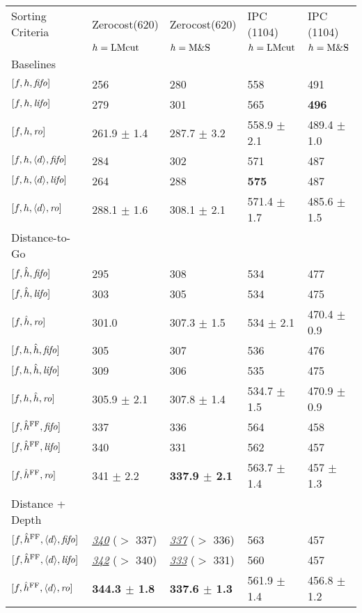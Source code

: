 \begin{center}
\begin{tabular}{|l|ll|ll|}
Sorting Criteria & Zerocost(620) & Zerocost(620) & IPC (1104) & IPC (1104)\\
 & \(h=\text{LMcut}\) & \(h=\text{M\&S}\) & \(h=\text{LMcut}\) & \(h=\text{M\&S}\)\\
Baselines &  &  &  & \\
\([f,h,{\text{\textit{fifo}}}]\) & 256 & 280 & 558 & 491\\
\([f,h,{\text{\textit{lifo}}}]\) & 279 & 301 & 565 & \textbf{496}\\
\([f,h,{\text{\textit{ro}}}]\) & 261.9 \(\pm\) 1.4 & 287.7 \(\pm\) 3.2 & 558.9 \(\pm\) 2.1 & 489.4 \(\pm\) 1.0\\
\([f,h,{\left<d\right>},{\text{\textit{fifo}}}]\) & 284 & 302 & 571 & 487\\
\([f,h,{\left<d\right>},{\text{\textit{lifo}}}]\) & 264 & 288 & \textbf{575} & 487\\
\([f,h,{\left<d\right>},{\text{\textit{ro}}}]\) & 288.1 \(\pm\) 1.6 & 308.1 \(\pm\) 2.1 & 571.4 \(\pm\) 1.7 & 485.6 \(\pm\) 1.5\\[0.3em]
Distance-to-Go &  &  &  & \\
\([f,\hat{h},{\text{\textit{fifo}}}]\) & 295 & 308 & 534 & 477\\
\([f,\hat{h},{\text{\textit{lifo}}}]\) & 303 & 305 & 534 & 475\\
\([f,\hat{h},{\text{\textit{ro}}}]\) & 301.0 & 307.3 \(\pm\) 1.5 & 534 \(\pm\) 2.1 & 470.4 \(\pm\) 0.9\\
\([f,h,\hat{h},{\text{\textit{fifo}}}]\) & 305 & 307 & 536 & 476\\
\([f,h,\hat{h},{\text{\textit{lifo}}}]\) & 309 & 306 & 535 & 475\\
\([f,h,\hat{h},{\text{\textit{ro}}}]\) & 305.9 \(\pm\) 2.1 & 307.8 \(\pm\) 1.4 & 534.7 \(\pm\) 1.5 & 470.9 \(\pm\) 0.9\\
\([f,\hat{h}^{\text{FF}},{\text{\textit{fifo}}}]\) & 337 & 336 & 564 & 458\\
\([f,\hat{h}^{\text{FF}},{\text{\textit{lifo}}}]\) & 340 & 331 & 562 & 457\\
\([f,\hat{h}^{\text{FF}},{\text{\textit{ro}}}]\) & 341 \(\pm\) 2.2 & \textbf{337.9 \(\pm\) 2.1} & 563.7 \(\pm\) 1.4 & 457 \(\pm\) 1.3\\[0.3em]
Distance + Depth &  &  &  & \\
\([f,\hat{h}^{\text{FF}},{\left<d\right>},{\text{\textit{fifo}}}]\) & \uline{\emph{340}} (\(>\) 337) & \uline{\emph{337}} (\(>\) 336) & 563 & 457\\
\([f,\hat{h}^{\text{FF}},{\left<d\right>},{\text{\textit{lifo}}}]\) & \uline{\emph{342}} (\(>\) 340) & \uline{\emph{333}} (\(>\) 331) & 560 & 457\\
\([f,\hat{h}^{\text{FF}},{\left<d\right>},{\text{\textit{ro}}}]\) & \textbf{344.3 \(\pm\) 1.8} & \textbf{337.6 \(\pm\) 1.3} & 561.9 \(\pm\) 1.4 & 456.8 \(\pm\) 1.2\\
\end{tabular}
\end{center}
